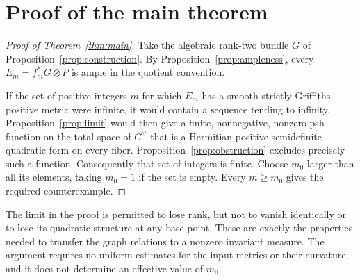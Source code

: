 \section{Proof of the main theorem}
\label{sec:conclusion}

\begin{proof}[Proof of Theorem~\ref{thm:main}]
Take the algebraic rank-two bundle $G$ of
Proposition~\ref{prop:construction}. By
Proposition~\ref{prop:ampleness}, every $E_m=f_m^*G\otimes P$ is ample
in the quotient convention.

If the set of positive integers $m$ for which $E_m$ has a smooth
strictly Griffiths-positive metric were infinite, it would contain
a sequence tending to infinity. Proposition~\ref{prop:limit} would
then give a finite, nonnegative, nonzero psh function on the total
space of $G^\vee$ that is a Hermitian positive semidefinite quadratic
form on every fiber. Proposition~\ref{prop:obstruction} excludes
precisely such a function. Consequently that set of integers is
finite. Choose $m_0$ larger than all its elements, taking $m_0=1$ if
the set is empty. Every $m\ge m_0$ gives the required counterexample.
\end{proof}

The limit in the proof is permitted to lose rank, but not to vanish
identically or to lose its quadratic structure at any base point.
These are exactly the properties needed to transfer the
graph relations to a nonzero invariant measure. The argument requires no uniform estimates for the input metrics or
their curvature, and it does not determine an effective value of $m_0$.
